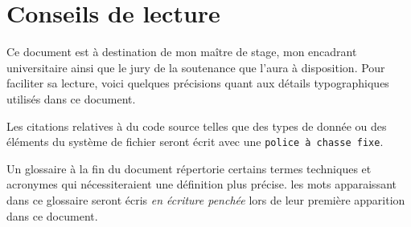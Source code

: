 \section*{Conseils de lecture}
Ce document est à destination de mon maître de stage, mon encadrant universitaire ainsi que le jury de la soutenance que l'aura à disposition. Pour faciliter sa lecture, voici quelques précisions quant aux détails typographiques utilisés dans ce document.

Les citations relatives à du code source telles que des types de donnée ou des éléments du système de fichier seront écrit avec une {\tt police à chasse fixe}.

Un glossaire à la fin du document répertorie certains termes techniques et acronymes qui nécessiteraient une définition plus précise. les mots apparaissant dans ce glossaire seront écris {\it en écriture penchée} lors de leur première apparition dans ce document.
